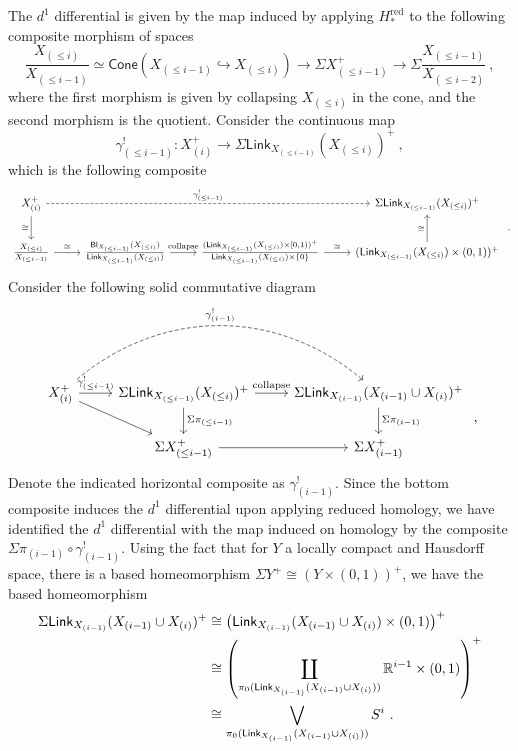\documentclass{article}
\newcommand{\msf}[1]{\mathsf{#1}}
\newcommand{\link}{\msf{Link}}
\newcommand{\bl}{\msf{Bl}}
\newcommand{\cone}{\msf{Cone}}
\newcommand*{\TakeFourierOrnament}[1]{{%
\fontencoding{U}\fontfamily{futs}\selectfont\char#1}}
\newcommand*{\danger}{\TakeFourierOrnament{66}}
\theoremstyle{definition}
\begin{document}
The $d^1$ differential is given by the map induced by applying $H_*^\text{red}$ to the following composite morphism of spaces
$$\frac{X_{(\le i)}}{X_{(\le i-1)}} \simeq \cone\left(X_{(\le i-1)} \hookrightarrow X_{(\le i)}\right) \to 
    \Sigma X_{(\le i-1)}^+ \to \Sigma \frac{X_{(\le i-1)}}{X_{(\le i-2)}}~,$$
where the first morphism is given by collapsing $X_{(\le i)}$ in the cone, and the second morphism is the quotient.
Consider the continuous map
$$\gamma_{(\le i-1)}^!: X_{(i)}^+ \to \Sigma \link_{X_{(\le i-1)}}(X_{(\le i)})^+~,$$
which is the following composite
$$\begin{tikzcd}
    X^+_{(i)} \arrow[d,"\cong",swap] \arrow[rrr,"\gamma_{(\le i-1)}^!",dashed] & & & 
        \Sigma \link_{X_{(\le i-1)}}(X_{(\le i)})^+ \\
    \frac{X_{(\le i)}}{X_{(\le i-1)}} \arrow[r,"\cong"] 
        & \frac{\bl_{X_{(\le i-1)}}(X_{(\le i)})}{\link_{X_{(\le i-1)}}(X_{(\le i)})} \arrow[r,"\text{collapse}"]
        & \frac{(\link_{X_{(\le i-1)}}(X_{(\le i)}) \times [0,1))^+}{\link_{X_{(\le i-1)}}(X_{(\le i)}) \times \{0\}}
            \arrow[r,"\cong"]
        & (\link_{X_{(\le i-1)}}(X_{(\le i)}) \times (0,1))^+ \arrow[u,"\cong"]
    \end{tikzcd}~.$$
Consider the following solid commutative diagram
$$\begin{tikzcd}
    X_{(i)}^+ \arrow[r,"\gamma^!_{(\le i-1)}"] \arrow[dr] \arrow[rr,bend left=40,"\gamma^!_{(i-1)}",dashed]
        & \Sigma \link_{X_{(\le i-1)}}(X_{(\le i)})^+ \arrow[d,"\Sigma\pi_{(\le i-1)}"] \arrow[r,"\text{collapse}"]  
        & \Sigma\link_{X_{(i-1)}}(X_{(i-1)}\cup X_{(i)})^+ \arrow[d,"\Sigma\pi_{(i-1)}"] \\
    & \Sigma X_{(\le i-1)}^+ \arrow[r] & \Sigma X_{(i-1)}^+
    \end{tikzcd}~,$$
Denote the indicated horizontal composite as $\gamma^!_{(i-1)}$. Since the bottom
composite induces the $d^1$ differential upon applying reduced homology, we have identified the $d^1$
differential with the map induced on homology by the composite $\Sigma\pi_{(i-1)} \circ \gamma^!_{(i-1)}.$
Using the fact that for $Y$ a locally compact and Hausdorff space, there is a based homeomorphism 
$\Sigma Y^+ \cong (Y \times (0,1))^+$, we have the based homeomorphism
\begin{align*}
    \Sigma\link_{X_{(i-1)}}(X_{(i-1)} \cup X_{(i)})^+ 
    &\cong \left(\link_{X_{(i-1)}}(X_{(i-1)} \cup X_{(i)}) \times (0,1)\right)^+ \\
    &\cong \left( \coprod_{\pi_0(\link_{X_{(i-1)}}(X_{(i-1)} \cup X_{(i)}))} \RR^{i-1} \times (0,1)\right)^+ \\
    &\cong \bigvee_{\pi_0(\link_{X_{(i-1)}}(X_{(i-1)} \cup X_{(i)}))} S^i~.
\end{align*}
\end{document}
